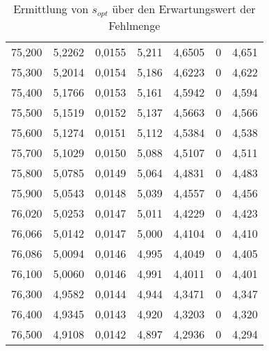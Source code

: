 \begin{table}
\begin{tabular}{|c||c|c|c||c|c|c|}
75,200 & 5,2262 & 0,0155 & 5,211 & 4,6505 & 0 & 4,651 \\
75,300 & 5,2014 & 0,0154 & 5,186 & 4,6223 & 0 & 4,622 \\
75,400 & 5,1766 & 0,0153 & 5,161 & 4,5942 & 0 & 4,594 \\
75,500 & 5,1519 & 0,0152 & 5,137 & 4,5663 & 0 & 4,566 \\
75,600 & 5,1274 & 0,0151 & 5,112 & 4,5384 & 0 & 4,538 \\
75,700 & 5,1029 & 0,0150 & 5,088 & 4,5107 & 0 & 4,511 \\
75,800 & 5,0785 & 0,0149 & 5,064 & 4,4831 & 0 & 4,483 \\
75,900 & 5,0543 & 0,0148 & 5,039 & 4,4557 & 0 & 4,456 \\
76,020 & 5,0253 & 0,0147 & 5,011 & 4,4229 & 0 & 4,423 \\
\hline
76,066 & 5,0142 & 0,0147 & \cellcolor[gray]{0.8} 5,000 & 4,4104 & 0 & 4,410 \\
\hline
76,086 & 5,0094 & 0,0146 & 4,995 & 4,4049 & 0 & 4,405 \\
76,100 & 5,0060 & 0,0146 & 4,991 & 4,4011 & 0 & 4,401 \\
76,300 & 4,9582 & 0,0144 & 4,944 & 4,3471 & 0 & 4,347 \\
76,400 & 4,9345 & 0,0143 & 4,920 & 4,3203 & 0 & 4,320 \\
76,500 & 4,9108 & 0,0142 & 4,897 & 4,2936 & 0 & 4,294 \\
\hline
\end{tabular}
\caption{Ermittlung von $s_{opt}$ über den Erwartungswert der Fehlmenge}
\end{table}